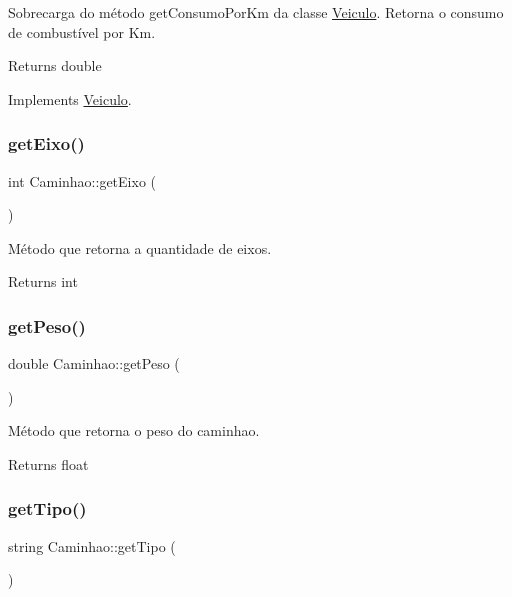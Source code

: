 Sobrecarga do método get\+Consumo\+Por\+Km da classe \hyperlink{classVeiculo}{Veiculo}. Retorna o consumo de combustível por Km.

\begin{DoxyReturn}{Returns}
double 
\end{DoxyReturn}


Implements \hyperlink{classVeiculo}{Veiculo}.

\mbox{\label{classCaminhao_a2f23320651bb9eacb11ac5b260241456}} 
\subsubsection{\texorpdfstring{get\+Eixo()}{getEixo()}}
{\footnotesize\ttfamily int Caminhao\+::get\+Eixo (\begin{DoxyParamCaption}{ }\end{DoxyParamCaption})}

Método que retorna a quantidade de eixos. \begin{DoxyReturn}{Returns}
int 
\end{DoxyReturn}
\mbox{\label{classCaminhao_a309d69ad26e53f1d704a2878b2c7b17a}} 
\subsubsection{\texorpdfstring{get\+Peso()}{getPeso()}}
{\footnotesize\ttfamily double Caminhao\+::get\+Peso (\begin{DoxyParamCaption}{ }\end{DoxyParamCaption})}

Método que retorna o peso do caminhao. \begin{DoxyReturn}{Returns}
float 
\end{DoxyReturn}
\mbox{\label{classCaminhao_aa1d2138301b0c5c8c2e022309ab55bc0}} 
\subsubsection{\texorpdfstring{get\+Tipo()}{getTipo()}}
{\footnotesize\ttfamily string Caminhao\+::get\+Tipo (\begin{DoxyParamCaption}{ }\end{DoxyParamCaption})\hspace{0.3cm}{\ttfamily [virtual]}}

